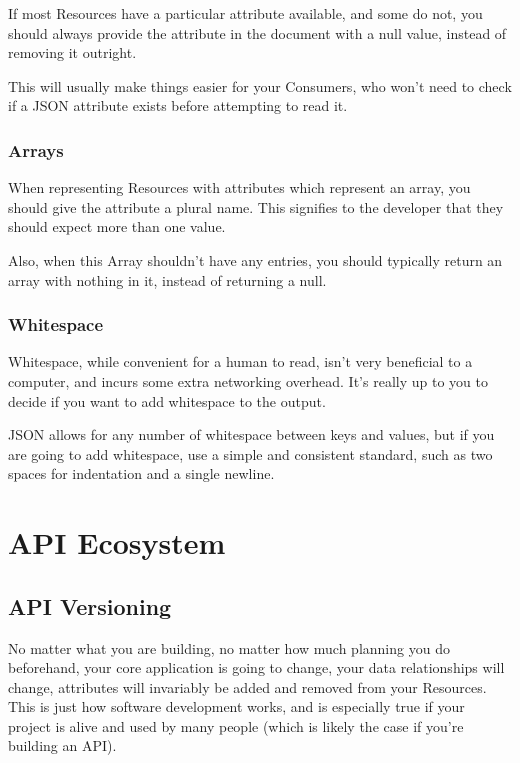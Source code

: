 \documentclass{book}
\begin{document}
If most Resources have a particular attribute available, and some do not, you should always provide the attribute in the document with a null value, instead of removing it outright.

This will usually make things easier for your Consumers, who won't need to check if a JSON attribute exists before attempting to read it.

\subsection{Arrays}

When representing Resources with attributes which represent an array, you should give the attribute a plural name. This signifies to the developer that they should expect more than one value.

Also, when this Array shouldn't have any entries, you should typically return an array with nothing in it, instead of returning a null.

\subsection{Whitespace}

Whitespace, while convenient for a human to read, isn't very beneficial to a computer, and incurs some extra networking overhead. It's really up to you to decide if you want to add whitespace to the output.

JSON allows for any number of whitespace between keys and values, but if you are going to add whitespace, use a simple and consistent standard, such as two spaces for indentation and a single newline.

\chapter{API Ecosystem}


\section{API Versioning}

No matter what you are building, no matter how much planning you do beforehand, your core application is going to change, your data relationships will change, attributes will invariably be added and removed from your Resources. This is just how software development works, and is especially true if your project is alive and used by many people (which is likely the case if you're building an API).
\end{document}
